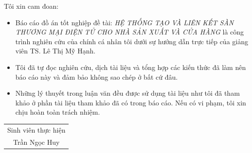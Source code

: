 \documentclass[11pt]{report}
\newcommand{\project}{HỆ THỐNG TẠO VÀ LIÊN KẾT SÀN THƯƠNG MẠI ĐIỆN TỬ CHO NHÀ SẢN XUẤT VÀ CỬA HÀNG}
\newcommand{\me}{Trần Ngọc Huy}
\newcommand{\advisor}{TS. Lê Thị Mỹ Hạnh}
\renewcommand{\listtablename}{Danh sách các bảng, hình vẽ}
\begin{document}
	Tôi xin cam đoan:
	\begin{itemize}
		\item Báo cáo đồ án tốt nghiệp đề tài: \emph{\project} là công trình nghiên cứu của chính cá nhân tôi dưới sự hướng dẫn trực tiếp của giảng viên \advisor.
		\item Tôi đã tự đọc nghiên cứu, dịch tài liệu và tổng hợp các kiến thức đã làm nên báo cáo này và đảm bảo không sao chép ở bất cứ đâu.
		\item Những lý thuyết trong luận văn đều được sử dụng tài liệu như tôi đã tham khảo ở phần tài liệu tham khảo đã có trong báo cáo. Nếu có vi phạm, tôi xin chịu hoàn toàn trách nhiệm.
	\end{itemize}
	
	\vspace{1cm}
	
	\hspace*{\fill}
	\begin{tabular}{c}  %
		{\large Sinh viên thực hiện}
		\vspace{3cm}\\
		\me
	\end{tabular}
	
	
	


	



	\fontsize{13px}{13px}\selectfont\justifying
	\renewcommand*\contentsname{MỤC LỤC}
	\cleardoublepage
	\tableofcontents

	
	\renewcommand{\listfigurename}{DANH SÁCH HÌNH VẼ}
	\renewcommand{\listtablename}{DANH SÁCH BẢNG}
	\listoffigures
	\listoftables
	
	\printglossary[title=DANH SÁCH TỪ VIẾT TẮT, toctitle=DANH SÁCH TỪ VIẾT TẮT]
	
\end{document}
